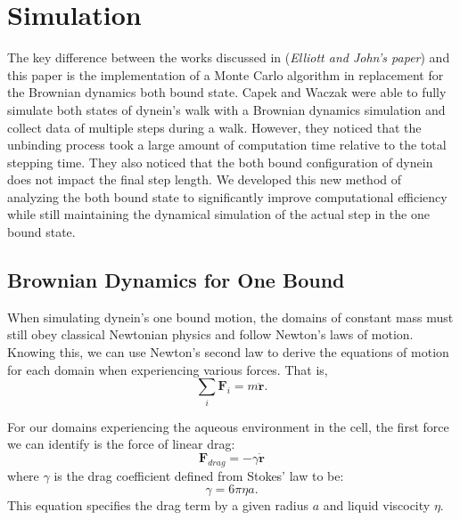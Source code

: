 \section{Simulation}

The key difference between the works discussed in \cite{Capek2017, } (\textit{Elliott and John's paper}) and this paper is the implementation of a Monte Carlo algorithm in replacement for the Brownian dynamics both bound state. Capek and Waczak were able to fully simulate both states of dynein's walk with a Brownian dynamics simulation and collect data of multiple steps during a walk. However, they noticed that the unbinding process took a large amount of computation time relative to the total stepping time. They also noticed that the both bound configuration of dynein does not impact the final step length. We developed this new method of analyzing the both bound state to significantly improve computational efficiency while still maintaining the dynamical simulation of the actual step in the one bound state. 



\subsection{Brownian Dynamics for One Bound}
\label{sec:BrownianDynamics}

When simulating dynein's one bound motion, the domains of constant mass must still obey classical Newtonian physics and follow Newton's laws of motion. Knowing this, we can use Newton's second law to derive the equations of motion for each domain when experiencing various forces. That is,
\begin{equation}
	\sum_{i}\textbf{F}_i=m\ddot{\textbf{r}}.
\end{equation} 

For our domains experiencing the aqueous environment in the cell, the first force we can identify is the force of linear drag:
\begin{equation}
	\textbf{F}_{drag}=-\gamma \dot{\textbf{r}}
\end{equation}
where $\gamma$ is the drag coefficient defined from Stokes' law to be:
\begin{equation}
	\gamma=6\pi\eta a.
\end{equation}
This equation specifies the drag term by a given radius $a$ and liquid viscocity $\eta$. 


